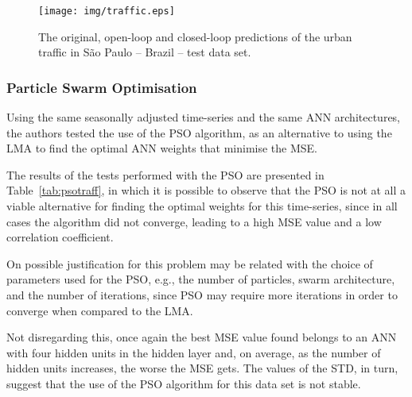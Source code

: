 \begin{figure*}[htbp]
  \centering
\texttt{[image: img/traffic.eps]}
  \caption{The original, open-loop and closed-loop predictions of the urban traffic in São Paulo -- Brazil -- test data set.}
  \label{fig:traffic}
\end{figure*}

\subsubsection{Particle Swarm Optimisation}

Using the same seasonally adjusted time-series and the same ANN architectures, the authors tested the use of the PSO algorithm, as an alternative to using the LMA to find the optimal ANN weights that minimise the MSE.

The results of the tests performed with the PSO are presented in Table~\ref{tab:psotraff}, in which it is possible to observe that the PSO is not at all a viable alternative for finding the optimal weights for this time-series, since in all cases the algorithm did not converge, leading to a high MSE value and a low correlation coefficient. 

On possible justification for this problem may be related with the choice of parameters used for the PSO, e.g., the number of particles, swarm architecture, and the number of iterations, since PSO may require more iterations in order to converge when compared to the LMA.  

Not disregarding this, once again the best MSE value found belongs to an ANN with four hidden units in the hidden layer and, on average, as the number of hidden units increases, the worse the MSE gets. The values of the STD, in turn, suggest that the use of the PSO algorithm for this data set is not stable. 

\begin{table}[htbp]
\centering
\caption{Summary of tests performed with the PSO algorithm of the urban traffic in São Paulo -- Brazil -- test data set.}
\label{tab:psotraff}
\end{table}

